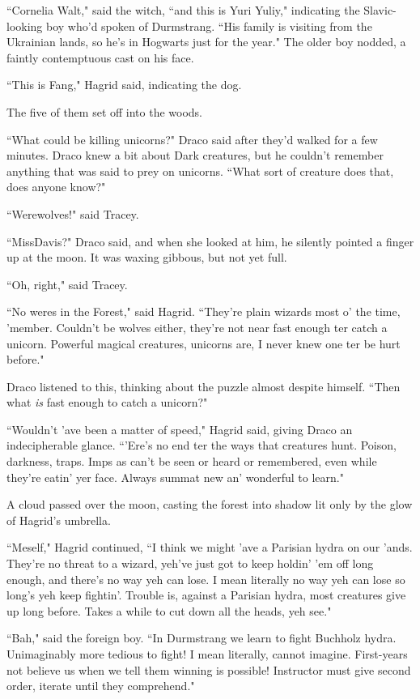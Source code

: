 ``Cornelia Walt," said the witch, ``and this is Yuri Yuliy," indicating the Slavic-looking boy who'd spoken of Durmstrang. ``His family is visiting from the Ukrainian lands, so he's in Hogwarts just for the year." The older boy nodded, a faintly contemptuous cast on his face.

``This is Fang," Hagrid said, indicating the dog.

The five of them set off into the woods.

``What could be killing unicorns?" Draco said after they'd walked for a few minutes. Draco knew a bit about Dark creatures, but he couldn't remember anything that was said to prey on unicorns. ``What sort of creature does that, does anyone know?"

``Werewolves!" said Tracey.

``Miss\?Davis?" Draco said, and when she looked at him, he silently pointed a finger up at the moon. It was waxing gibbous, but not yet full.

``Oh, right," said Tracey.

``No weres in the Forest," said Hagrid. ``They're plain wizards most o' the time, 'member. Couldn't be wolves either, they're not near fast enough ter catch a unicorn. Powerful magical creatures, unicorns are, I never knew one ter be hurt before."

Draco listened to this, thinking about the puzzle almost despite himself. ``Then what \emph{is} fast enough to catch a unicorn?"

``Wouldn't 'ave been a matter of speed," Hagrid said, giving Draco an indecipherable glance. ``'Ere's no end ter the ways that creatures hunt. Poison, darkness, traps. Imps as can't be seen or heard or remembered, even while they're eatin' yer face. Always summat new an' wonderful to learn."

A cloud passed over the moon, casting the forest into shadow lit only by the glow of Hagrid's umbrella.

``Meself," Hagrid continued, ``I think we might 'ave a Parisian hydra on our 'ands. They're no threat to a wizard, yeh've just got to keep holdin' 'em off long enough, and there's no way yeh can lose. I mean literally no way yeh can lose so long's yeh keep fightin'. Trouble is, against a Parisian hydra, most creatures give up long before. Takes a while to cut down all the heads, yeh see."

``Bah," said the foreign boy. ``In Durmstrang we learn to fight Buchholz hydra. Unimaginably more tedious to fight! I mean literally, cannot imagine. First-years not believe us when we tell them winning is possible! Instructor must give second order, iterate until they comprehend."

